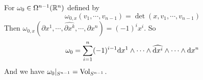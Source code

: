 \begin{example}
    For  $ \omega_0\in\Omega^{n-1}(\mathbb R^n ) $ defined by 
    \[\omega_{0,x}(v_1,\cdots,v_{n-1})=\det(x,v_1,\cdots,v_{n-1})\]
    Then   $ \omega_{0,x}(\partial x^1,\cdots,\hat{\partial x^k},\cdots,\partial x^n)=(-1)^ix^i $. 
    So 
    \[\omega_0=\displaystyle\sum_{i=1}^n(-1)^{i-1}\mathrm{d} x^1\wedge\cdots\wedge\widehat{\mathrm{d} x^i}\wedge\cdots\wedge\mathrm{d} x^n\]
    And we have  $ \omega_0|_{S^{n-1}}=\mathrm{Vol}_{S^{n-1}} $. 
\end{example}
